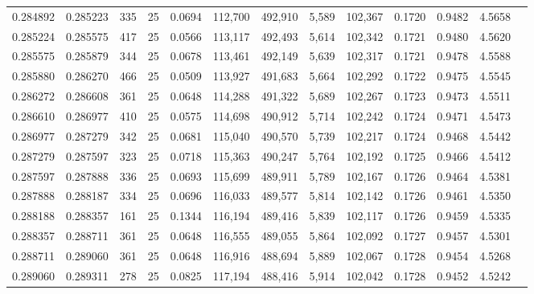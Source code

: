 \begin{tabular}{rrrrrrrrrrrrr}
0.284892 & 0.285223 &   335 &  25 &                                     0.0694 & 112,700 & 492,910 &   5,589 & 102,367 & 0.1720 & 0.9482 & 4.5658 \\
0.285224 & 0.285575 &   417 &  25 &                                     0.0566 & 113,117 & 492,493 &   5,614 & 102,342 & 0.1721 & 0.9480 & 4.5620 \\
0.285575 & 0.285879 &   344 &  25 &                                     0.0678 & 113,461 & 492,149 &   5,639 & 102,317 & 0.1721 & 0.9478 & 4.5588 \\
0.285880 & 0.286270 &   466 &  25 &                                     0.0509 & 113,927 & 491,683 &   5,664 & 102,292 & 0.1722 & 0.9475 & 4.5545 \\
0.286272 & 0.286608 &   361 &  25 &                                     0.0648 & 114,288 & 491,322 &   5,689 & 102,267 & 0.1723 & 0.9473 & 4.5511 \\
0.286610 & 0.286977 &   410 &  25 &                                     0.0575 & 114,698 & 490,912 &   5,714 & 102,242 & 0.1724 & 0.9471 & 4.5473 \\
0.286977 & 0.287279 &   342 &  25 &                                     0.0681 & 115,040 & 490,570 &   5,739 & 102,217 & 0.1724 & 0.9468 & 4.5442 \\
0.287279 & 0.287597 &   323 &  25 &                                     0.0718 & 115,363 & 490,247 &   5,764 & 102,192 & 0.1725 & 0.9466 & 4.5412 \\
0.287597 & 0.287888 &   336 &  25 &                                     0.0693 & 115,699 & 489,911 &   5,789 & 102,167 & 0.1726 & 0.9464 & 4.5381 \\
0.287888 & 0.288187 &   334 &  25 &                                     0.0696 & 116,033 & 489,577 &   5,814 & 102,142 & 0.1726 & 0.9461 & 4.5350 \\
0.288188 & 0.288357 &   161 &  25 &                                     0.1344 & 116,194 & 489,416 &   5,839 & 102,117 & 0.1726 & 0.9459 & 4.5335 \\
0.288357 & 0.288711 &   361 &  25 &                                     0.0648 & 116,555 & 489,055 &   5,864 & 102,092 & 0.1727 & 0.9457 & 4.5301 \\
0.288711 & 0.289060 &   361 &  25 &                                     0.0648 & 116,916 & 488,694 &   5,889 & 102,067 & 0.1728 & 0.9454 & 4.5268 \\
0.289060 & 0.289311 &   278 &  25 &                                     0.0825 & 117,194 & 488,416 &   5,914 & 102,042 & 0.1728 & 0.9452 & 4.5242 \\

\end{tabular}
